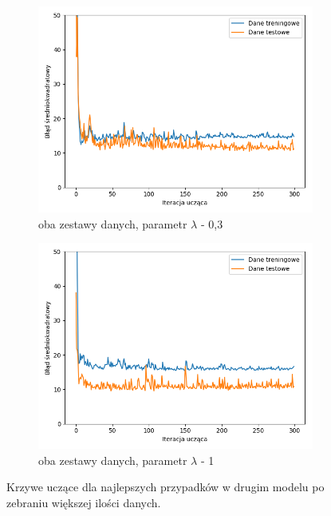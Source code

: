\documentclass[12pt]{aghdpl}
\begin{document}
\begin{figure}[h]
		 	\begin{subfigure}{.5\linewidth}
		 		\includegraphics[width =\linewidth]{wykresy/8_zebranie_wiekszej_ilosci_danych/0-400/regularyzacja_0_3_wykres_uczenia.png}
		 		\caption{oba zestawy danych, parametr $\lambda$ - 0,3}
		 	\end{subfigure}
		 	\begin{subfigure}{.5\linewidth}
		 		\includegraphics[width =\linewidth]{wykresy/8_zebranie_wiekszej_ilosci_danych/0-400/regularyzacja_1_wykres_uczenia.png}
		 		\caption{oba zestawy danych, parametr $\lambda$ - 1}
		 	\end{subfigure}
	 	
 			\caption{Krzywe uczące dla najlepszych przypadków w drugim modelu po zebraniu większej ilości danych.}
			\label{fig: drugi_model_po_zebraniu_wiekszej_ilosci_danych_wykresy_uczenia}
		\end{figure}
		
\end{document}
